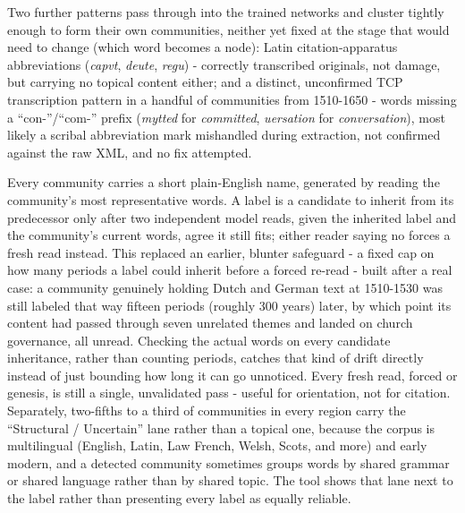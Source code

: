 \documentclass[11pt]{article}
\begin{document}
\begin{claimbox}
 Two further patterns
pass through into the trained networks and cluster tightly enough to
form their own communities, neither yet fixed at the stage that would
need to change (which word becomes a node): Latin citation-apparatus
abbreviations (\emph{capvt}, \emph{deute}, \emph{regu}) - correctly
transcribed originals, not damage, but carrying no topical content
either; and a distinct, unconfirmed TCP transcription pattern in a
handful of communities from 1510-1650 - words missing a
``con-''/``com-'' prefix (\emph{mytted} for \emph{committed},
\emph{uersation} for \emph{conversation}), most likely a scribal
abbreviation mark mishandled during extraction, not confirmed against
the raw XML, and no fix attempted.
\end{claimbox}

\begin{claimbox}
 Every community carries a short
plain-English name, generated by reading the community's most
representative words. A label is a candidate to inherit from its
predecessor only after two independent model reads, given the
inherited label and the community's current words, agree it still
fits; either reader saying no forces a fresh read instead. This
replaced an earlier, blunter safeguard - a fixed cap on how many
periods a label could inherit before a forced re-read - built after a
real case: a community genuinely holding Dutch and German text at
1510-1530 was still labeled that way fifteen periods (roughly 300
years) later, by which point its content had passed through seven
unrelated themes and landed on church governance, all unread. Checking
the actual words on every candidate inheritance, rather than counting
periods, catches that kind of drift directly instead of just bounding
how long it can go unnoticed. Every fresh read, forced or genesis, is
still a single, unvalidated pass - useful for orientation, not for
citation. Separately, two-fifths to a third of
communities in every region carry the ``Structural / Uncertain'' lane
rather than a topical one, because the corpus is multilingual (English,
Latin, Law French, Welsh, Scots, and more) and early modern, and a detected
community sometimes groups words by shared grammar or shared language
rather than by shared topic. The tool shows that lane next to the label
rather than presenting every label as equally reliable.
\end{claimbox}
\end{document}
